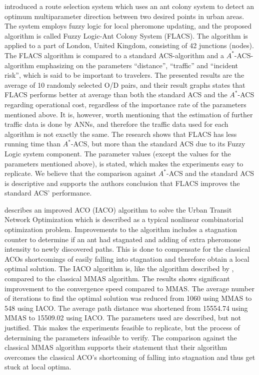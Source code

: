 \citet{salehinejad10} introduced a route selection system which uses an ant colony system to detect an optimum multiparameter direction between two desired points in urban areas. The system employs fuzzy logic for local pheromone updating, and the proposed algorithm is called Fuzzy Logic-Ant Colony System (FLACS). The algorithm is applied to a part of London, United Kingdom, consisting of 42 junctions (nodes). The FLACS algorithm is compared to a standard ACS-algorithm and a $A^*$-ACS-algorithm emphasizing on the parameters ``distance'', ``traffic'' and ``incident risk'', which is said to be important to travelers. The presented results are the average of 10 randomly selected O/D pairs, and their result graphs states that FLACS performs better at average than both the standard ACS and the $A^*$-ACS regarding operational cost, regardless of the importance rate of the parameters mentioned above. It is, however, worth mentioning that the estimation of further traffic data is done by ANNs, and therefore the traffic data used for each algorithm is not exactly the same. The research shows that FLACS has less running time than $A^*$-ACS, but more than the standard ACS due to its Fuzzy Logic system component. The parameter values (except the values for the parameters mentioned above), is stated, which makes the experiments easy to replicate. We believe that the comparison against $A^*$-ACS and the standard ACS is descriptive and supports the authors conclusion that FLACS improves the standard ACS' performance. 

\citet{jiang10} describes an improved ACO (IACO) algorithm to solve the Urban Transit Network Optimization which is described as a typical nonlinear combinatorial optimization problem. Improvements to the algorithm includes a stagnation counter to determine if an ant had stagnated and adding of extra pheromone intensity to newly discovered paths. This is done to compensate for the classical ACOs shortcomings of easily falling into stagnation and therefore obtain a local optimal solution. The IACO algorithm is, like the algorithm described by \citet{yang07}, compared to the classical MMAS algorithm. The results shows significant improvement to the convergence speed compared to MMAS. The average number of iterations to find the optimal solution was reduced from 1060 using MMAS to 548 using IACO. The average path distance was shortened from 15554.74 using MMAS to 15509.02 using IACO. The parameters used are described, but not justified. This makes the experiments feasible to replicate, but the process of determining the parameters infeasible to verify. The comparison against the classical MMAS algorithm supports their statement that their algorithm overcomes the classical ACO's shortcoming of falling into stagnation and thus get stuck at local optima. 

